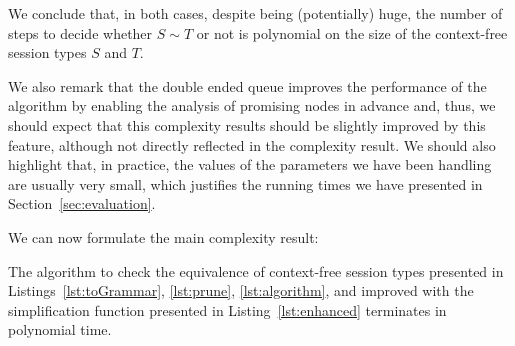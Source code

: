 We conclude that, in both cases, despite being (potentially) huge, the
number of steps to decide whether $S\sim T$ or not is polynomial on 
the size of the context-free session types $S$ and $T$.

We also remark that the double ended queue improves the 
performance of the algorithm by enabling the analysis of promising nodes 
in advance and, thus, we should expect that this complexity
results should be slightly improved by this feature, 
although not directly reflected in the complexity result.
We should also highlight that, in practice, the values of the 
parameters we have been handling are usually very small,
which justifies the running times we have presented in 
Section~\ref{sec:evaluation}.

We can now formulate the main complexity result:

\begin{theorem}
	The algorithm to check the equivalence of context-free 
	session types presented in Listings~\ref{lst:toGrammar},
	\ref{lst:prune}, \ref{lst:algorithm}, and improved with the
	simplification function presented in Listing~\ref{lst:enhanced}
	terminates in polynomial time.
\end{theorem}


























